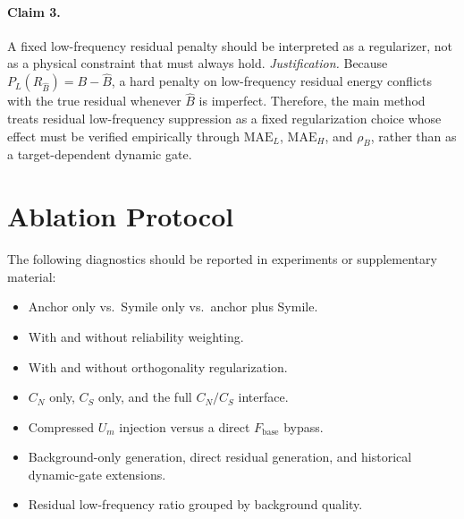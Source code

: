 \documentclass[letterpaper]{article}
\begin{document}
\paragraph{Claim 3.}
A fixed low-frequency residual penalty should be interpreted as a regularizer, not as a physical constraint that must always hold.
\textit{Justification.}
Because $P_L(R_{\hat B})=B-\hat B$, a hard penalty on low-frequency residual energy conflicts with the true residual whenever $\hat B$ is imperfect. Therefore, the main method treats residual low-frequency suppression as a fixed regularization choice whose effect must be verified empirically through $\mathrm{MAE}_L$, $\mathrm{MAE}_H$, and $\rho_B$, rather than as a target-dependent dynamic gate.

\section{Ablation Protocol}
The following diagnostics should be reported in experiments or supplementary material:
\begin{itemize}
\item Anchor only vs.\ Symile only vs.\ anchor plus Symile.
\item With and without reliability weighting.
\item With and without orthogonality regularization.
\item $C_N$ only, $C_S$ only, and the full $C_N/C_S$ interface.
\item Compressed $U_m$ injection versus a direct $F_{\mathrm{base}}$ bypass.
\item Background-only generation, direct residual generation, and historical dynamic-gate extensions.
\item Residual low-frequency ratio grouped by background quality.
\end{itemize}


\end{document}
